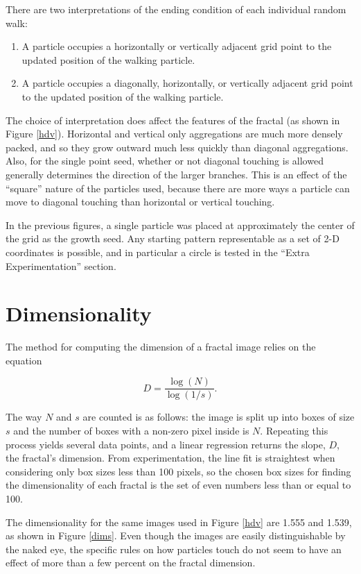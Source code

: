 \documentclass[12pt]{article}
\begin{document}
There are two interpretations of the ending condition of each individual random walk:

\begin{enumerate}
\item{A particle occupies a horizontally or vertically adjacent grid point to the updated position of the walking particle.}
\item{A particle occupies a diagonally, horizontally, or vertically adjacent grid point to the updated position of the walking particle.}
\end{enumerate}

The choice of interpretation does affect the features of the fractal (as shown in Figure \ref{hdv}).
Horizontal and vertical only aggregations are much more densely packed, and so they grow outward much less quickly than diagonal aggregations.
Also, for the single point seed, whether or not diagonal touching is allowed generally determines the direction of the larger branches.
This is an effect of the ``square'' nature of the particles used, because there are more ways a particle can move to diagonal touching than horizontal or vertical touching.

In the previous figures, a single particle was placed at approximately the center of the grid as the growth seed.
Any starting pattern representable as a set of 2-D coordinates is possible, and in particular a circle is tested in the ``Extra Experimentation'' section.


\section*{Dimensionality}


The method for computing the dimension of a fractal image relies on the equation

\[
D = \frac{\log(N)}{\log(1/s)} .
\]

The way $N$ and $s$ are counted is as follows: the image is split up into boxes of size $s$ and the number of boxes with a non-zero pixel inside is $N$.
Repeating this process yields several data points, and a linear regression returns the slope, $D$, the fractal's dimension.
From experimentation, the line fit is straightest when considering only box sizes less than 100 pixels, so the chosen box sizes for finding the dimensionality of each fractal is the set of even numbers less than or equal to 100.

The dimensionality for the same images used in Figure \ref{hdv} are 1.555 and 1.539, as shown in Figure \ref{dims}.
Even though the images are easily distinguishable by the naked eye, the specific rules on how particles touch do not seem to have an effect of more than a few percent on the fractal dimension.
\end{document}

